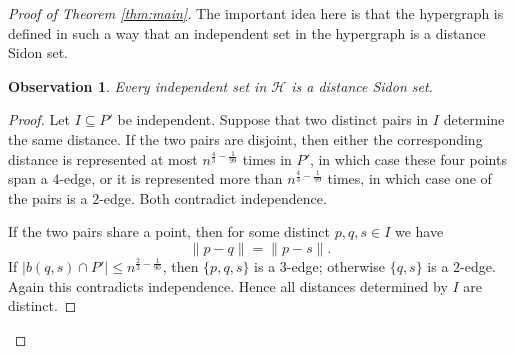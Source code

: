 \documentclass[11pt,oneside]{amsart}
\numberwithin{exercise}{subsection}
\newtheorem{obs}{Observation}
\begin{document}
\begin{proof}[Proof of Theorem \ref{thm:main}]
The important idea here is that the hypergraph is defined in such a way that an independent set in the hypergraph is a distance Sidon set. 
\begin{obs}
\label{indepinH}
Every independent set in \(\mathcal H\) is a distance Sidon set.
\end{obs}

\begin{proof}
Let $I\subseteq P'$ be independent. Suppose that two distinct pairs in $I$
determine the same distance. If the two pairs are disjoint, then either the
corresponding distance is represented at most $n^{\frac43-\frac1{99}}$ times
in $P'$, in which case these four points span a $4$-edge, or it is represented
more than $n^{\frac43-\frac1{99}}$ times, in which case one of the pairs is a
$2$-edge. Both contradict independence.

If the two pairs share a point, then for some distinct $p,q,s\in I$ we have
\[
\|p-q\|=\|p-s\|.
\]
If $|b(q,s)\cap P'|\leq n^{\frac23-\frac1{90}}$, then $\{p,q,s\}$ is a
$3$-edge; otherwise $\{q,s\}$ is a $2$-edge. Again this contradicts
independence. Hence all distances determined by $I$ are distinct.
\end{proof}


\end{proof}
\end{document}

